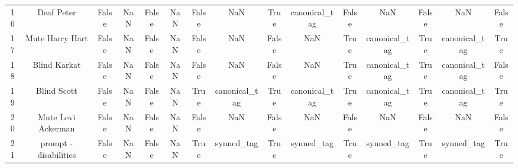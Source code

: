 \begin{table}[h!]
{\begin{tabular}{|c|c|c|c|c|c|c|c|c|c|c|c|c|c|c|}
         16 &                                        Deaf Peter &                          False &                       NaN &                          False &                       NaN &                          False &                       NaN &                           True &             canonical\_tag &                          False &                       NaN &                          False &                       NaN &                          False \\
         17 &                                   Mute Harry Hart &                          False &                       NaN &                          False &                       NaN &                          False &                       NaN &                          False &                       NaN &                           True &             canonical\_tag &                           True &             canonical\_tag &                           True \\
         18 &                                      Blind Karkat &                          False &                       NaN &                          False &                       NaN &                          False &                       NaN &                          False &                       NaN &                           True &             canonical\_tag &                           True &             canonical\_tag &                          False \\
         19 &                                       Blind Scott &                          False &                       NaN &                          False &                       NaN &                           True &             canonical\_tag &                           True &             canonical\_tag &                           True &             canonical\_tag &                           True &             canonical\_tag &                           True \\
         20 &                                Mute Levi Ackerman &                          False &                       NaN &                          False &                       NaN &                          False &                       NaN &                          False &                       NaN &                          False &                       NaN &                          False &                       NaN &                          False \\
         21 &                             prompt - disabilities &                          False &                       NaN &                          False &                       NaN &                           True &                synned\_tag &                           True &                synned\_tag &                           True &                synned\_tag &                           True &                synned\_tag &                           True \\

\end{tabular}}
\end{table}
